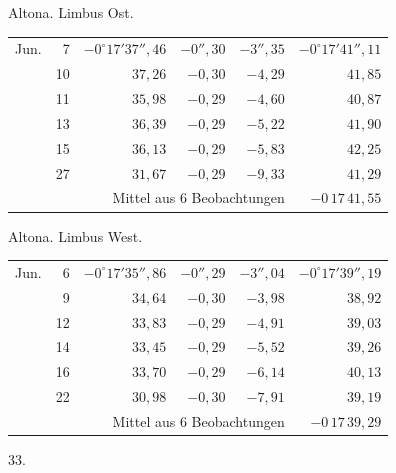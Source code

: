 \noindent\begin{minipage}[t]{.495\textwidth}\centering Altona. Limbus Ost.\par\smallskip
{\scriptsize\setlength{\tabcolsep}{1pt}\renewcommand{\arraystretch}{1.2}\begin{tabular}{lr|r|r|r|r|}
Jun.&7&$-0^\circ17'37''{,}46$&$-0''{,}30$&$-3''{,}35$&$-0^\circ17'41''{,}11$\\
&10&$37{,}26$&$-0{,}30$&$-4{,}29$&$41{,}85$\\
&11&$35{,}98$&$-0{,}29$&$-4{,}60$&$40{,}87$\\
&13&$36{,}39$&$-0{,}29$&$-5{,}22$&$41{,}90$\\
&15&$36{,}13$&$-0{,}29$&$-5{,}83$&$42{,}25$\\
&27&$31{,}67$&$-0{,}29$&$-9{,}33$&$41{,}29$\\
\cline{6-6}\multicolumn{5}{r}{Mittel aus 6 Beobachtungen}&$-0\,17\,41{,}55$
\end{tabular}}\end{minipage}\hfill\begin{minipage}[t]{.495\textwidth}\centering Altona. Limbus West.\par\smallskip
{\scriptsize\setlength{\tabcolsep}{1pt}\renewcommand{\arraystretch}{1.2}\begin{tabular}{lr|r|r|r|r}
Jun.&6&$-0^\circ17'35''{,}86$&$-0''{,}29$&$-3''{,}04$&$-0^\circ17'39''{,}19$\\
&9&$34{,}64$&$-0{,}30$&$-3{,}98$&$38{,}92$\\
&12&$33{,}83$&$-0{,}29$&$-4{,}91$&$39{,}03$\\
&14&$33{,}45$&$-0{,}29$&$-5{,}52$&$39{,}26$\\
&16&$33{,}70$&$-0{,}29$&$-6{,}14$&$40{,}13$\\
&22&$30{,}98$&$-0{,}30$&$-7{,}91$&$39{,}19$\\
\cline{6-6}\multicolumn{5}{r}{Mittel aus 6 Beobachtungen}&$-0\,17\,39{,}29$
\end{tabular}}\end{minipage}
\par\vspace{4mm}
\begin{center}33.\end{center}

